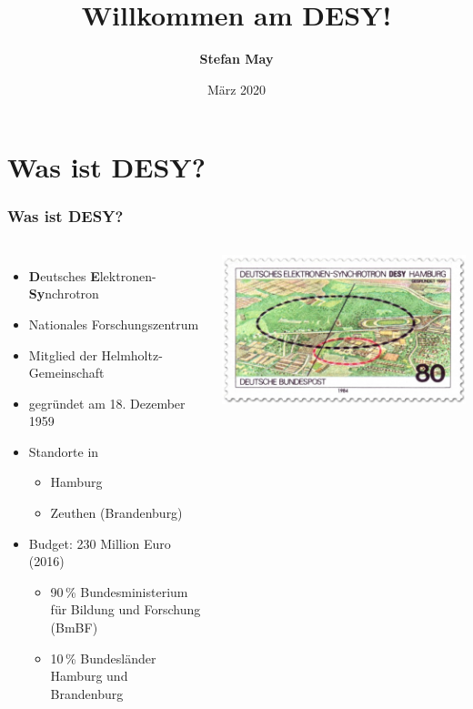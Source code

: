 \documentclass[10pt,t]{beamer}
\title[Willkommen am DESY]{Willkommen am DESY!}
\author[Stefan May]{\textbf{Stefan May}}
\institute{Softwareentwickler und Strahlenschutzbeauftragter\\Gruppe MPS (Maschine Personensicherheit)\\[\baselineskip]Einführungsvortrag}
\date[März 2020]{März 2020}
\begin{document}
\maketitle

\section{Was ist DESY?}

\begin{frame}
\frametitle{Was ist DESY?}
\vspace*{-2\baselineskip}
\begin{columns}[c]
\begin{itemize}
    \item \textbf{D}eutsches \textbf{E}lektronen-\textbf{Sy}nchrotron
    \item Nationales Forschungszentrum
    \item Mitglied der Helmholtz-Gemeinschaft
    \item gegründet am 18. Dezember 1959
    \item Standorte in
    \begin{itemize}
        \item Hamburg
        \item Zeuthen (Brandenburg)
    \end{itemize}
    \item Budget: 230 Million Euro (2016)
    \begin{itemize}
        \item 90\,\% Bundesministerium für Bildung und Forschung (BmBF)
        \item 10\,\% Bundesländer Hamburg und Brandenburg
    \end{itemize}
\end{itemize}
    \includegraphics[width=\textwidth]{briefmarke} \\[1ex]

\end{columns}
\end{frame}
\end{document}
